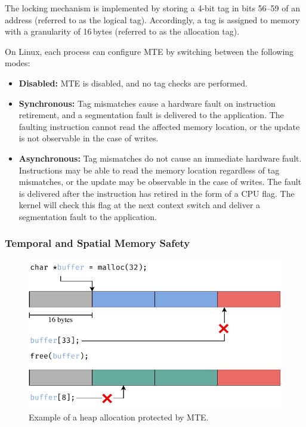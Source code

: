 The locking mechanism is implemented by storing a 4-bit tag in bits 56--59 of an address (referred to as the logical tag).
Accordingly, a tag is assigned to memory with a granularity of 16\,bytes (referred to as the allocation tag).

On Linux, each process can configure \ac{MTE} by switching between the following modes:
\begin{itemize}
    \item \textbf{Disabled:} \ac{MTE} is disabled, and no tag checks are performed.
    \item \textbf{Synchronous:}
    Tag mismatches cause a hardware fault on instruction retirement, and a segmentation fault is delivered to the application.
    The faulting instruction cannot read the affected memory location, or the update is not observable in the case of writes.
    \item \textbf{Asynchronous:}
    Tag mismatches do not cause an immediate hardware fault.
    Instructions may be able to read the memory location regardless of tag mismatches, or the update may be observable in the case of writes.
    The fault is delivered after the instruction has retired in the form of a CPU flag.
    The kernel will check this flag at the next context switch and deliver a segmentation fault to the application.
\end{itemize}


\subsubsection{Temporal and Spatial Memory Safety}

\begin{figure}[t]
    \centering
    \includegraphics[scale=1]{figures/build/mte}
    \caption{Example of a heap allocation protected by \ac{MTE}.}
    \label{fig:mte}
\end{figure}

